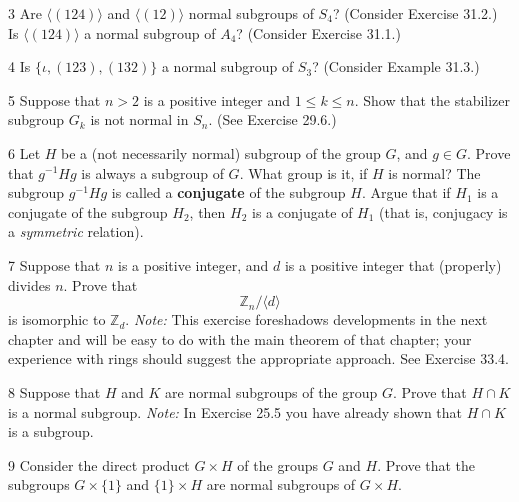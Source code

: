 \begin{problem}{3}
    Are $\langle (124) \rangle$ and $\langle (12) \rangle$ normal subgroups of $S_4$?
    (Consider Exercise 31.2.) Is $\langle (124) \rangle$ a normal subgroup of $A_4$?
    (Consider Exercise 31.1.)
\end{problem}
\unsolved

\begin{problem}{4}
    Is $\{\iota, (123), (132)\}$ a normal subgroup of $S_3$? (Consider Example 31.3.)
\end{problem}
\unsolved

\begin{problem}{5}
    Suppose that $n > 2$ is a positive integer and $1 \le k \le n$. Show that the
    stabilizer subgroup $G_k$ is not normal in $S_n$. (See Exercise 29.6.)
\end{problem}
\unsolved

\begin{problem}{6}
    Let $H$ be a (not necessarily normal) subgroup of the group $G$, and $g \in G$. Prove
    that $g^{-1}Hg$ is always a subgroup of $G$. What group is it, if $H$ is normal? The
    subgroup $g^{-1}Hg$ is called a \textbf{conjugate} of the subgroup $H$. Argue that if
    $H_1$ is a conjugate of the subgroup $H_2$, then $H_2$ is a conjugate of $H_1$ (that
    is, conjugacy is a \emph{symmetric} relation).
\end{problem}
\unsolved

\begin{problem}{7}
    Suppose that $n$ is a positive integer, and $d$ is a positive integer that (properly)
    divides $n$. Prove that
    \[\mathbb{Z}_n/\langle d \rangle\]
    is isomorphic to $\mathbb{Z}_d$. \emph{Note:} This exercise foreshadows developments in
    the next chapter and will be easy to do with the main theorem of that chapter; your
    experience with rings should suggest the appropriate approach. See Exercise 33.4.
\end{problem}
\unsolved

\begin{problem}{8}
    Suppose that $H$ and $K$ are normal subgroups of the group $G$. Prove that $H \cap K$
    is a normal subgroup. \emph{Note:} In Exercise 25.5 you have already shown that
    $H \cap K$ is a subgroup.
\end{problem}
\unsolved

\begin{problem}{9}
    Consider the direct product $G \times H$ of the groups $G$ and $H$. Prove that the
    subgroups $G \times \{1\}$ and $\{1\} \times H$ are normal subgroups of $G \times H$.
\end{problem}
\unsolved

